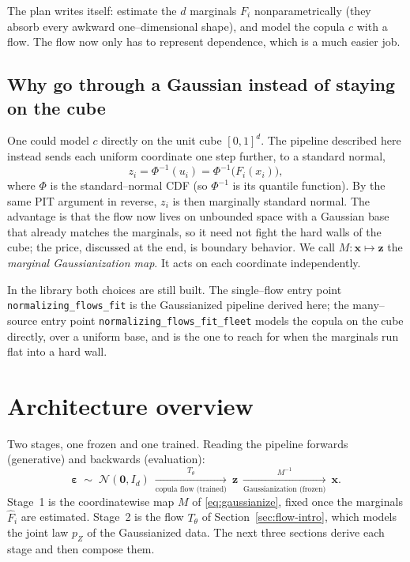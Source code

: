 \documentclass[11pt]{article}
\newcommand{\Ncal}{\mathcal{N}}
\newcommand{\x}{\bm{x}}
\newcommand{\z}{\bm{z}}
\newcommand{\eps}{\bm{\varepsilon}}
\newcommand{\Fhat}{\widehat{F}}
\theoremstyle{remark}
\begin{document}
The plan writes itself: estimate the $d$ marginals $F_i$ nonparametrically (they
absorb every awkward one--dimensional shape), and model the copula $c$ with a
flow. The flow now only has to represent dependence, which is a much easier job.

\subsection{Why go through a Gaussian instead of staying on the cube}

One could model $c$ directly on the unit cube $[0,1]^d$. The pipeline described
here instead sends each uniform coordinate one step further, to a standard normal,
\begin{equation}
\label{eq:gaussianize}
z_i=\Phi^{-1}(u_i)=\Phi^{-1}\bigl(F_i(x_i)\bigr),
\end{equation}
where $\Phi$ is the standard--normal CDF (so $\Phi^{-1}$ is its quantile
function). By the same PIT argument in reverse, $z_i$ is then marginally standard
normal. The advantage is that the flow now lives on unbounded space with a
Gaussian base that already matches the marginals, so it need not fight the hard
walls of the cube; the price, discussed at the end, is boundary behavior. We call
$M:\x\mapsto\z$ the \emph{marginal Gaussianization map}. It acts on each
coordinate independently.

In the library both choices are still built. The single--flow entry point
\texttt{normalizing\_flows\_fit} is the Gaussianized pipeline derived here; the
many--source entry point \texttt{normalizing\_flows\_fit\_fleet} models the
copula on the cube directly, over a uniform base, and is the one to reach for
when the marginals run flat into a hard wall.

\section{Architecture overview}
\label{sec:arch}

Two stages, one frozen and one trained. Reading the pipeline forwards
(generative) and backwards (evaluation):
\begin{equation}
\label{eq:pipeline}
\eps\;\sim\;\Ncal(\bm0,I_d)
\ \xrightarrow[\text{copula flow (trained)}]{\ T_\theta\ }\ \z
\ \xrightarrow[\text{Gaussianization (frozen)}]{\ M^{-1}\ }\ \x .
\end{equation}
Stage~1 is the coordinatewise map $M$ of \eqref{eq:gaussianize}, fixed once the
marginals $\Fhat_i$ are estimated. Stage~2 is the flow $T_\theta$ of
Section~\ref{sec:flow-intro}, which models the joint law $p_Z$ of the Gaussianized
data. The next three sections derive each stage and then compose them.
\end{document}
